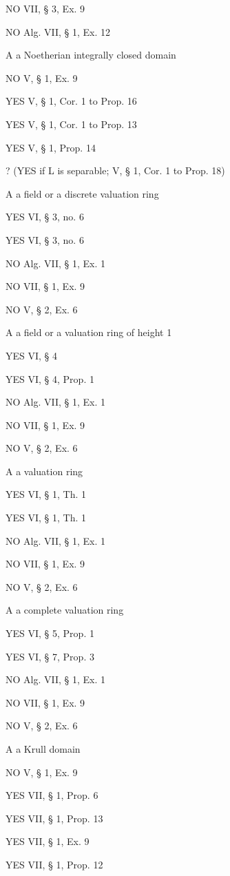 NO VII, § 3, Ex. 9

NO Alg. VII, § 1, Ex. 12

A a Noetherian integrally closed domain

NO V, § 1, Ex. 9

YES V, § 1, Cor. 1 to Prop. 16

YES V, § 1, Cor. 1 to Prop. 13

YES V, § 1, Prop. 14

? (YES if L is separable; V, § 1, Cor. 1 to Prop. 18)

A a field or a discrete valuation ring

YES VI, § 3, no. 6

YES VI, § 3, no. 6

NO Alg. VII, § 1, Ex. 1

NO VII, § 1, Ex. 9

NO V, § 2, Ex. 6

A a field or a valuation ring of height 1

YES VI, § 4

YES VI, § 4, Prop. 1

NO Alg. VII, § 1, Ex. 1

NO VII, § 1, Ex. 9

NO V, § 2, Ex. 6

A a valuation ring

YES VI, § 1, Th. 1

YES VI, § 1, Th. 1

NO Alg. VII, § 1, Ex. 1

NO VII, § 1, Ex. 9

NO V, § 2, Ex. 6

A a complete valuation ring

YES VI, § 5, Prop. 1

YES VI, § 7, Prop. 3

NO Alg. VII, § 1, Ex. 1

NO VII, § 1, Ex. 9

NO V, § 2, Ex. 6

A a Krull domain

NO V, § 1, Ex. 9

YES VII, § 1, Prop. 6

YES VII, § 1, Prop. 13

YES VII, § 1, Ex. 9

YES VII, § 1, Prop. 12

